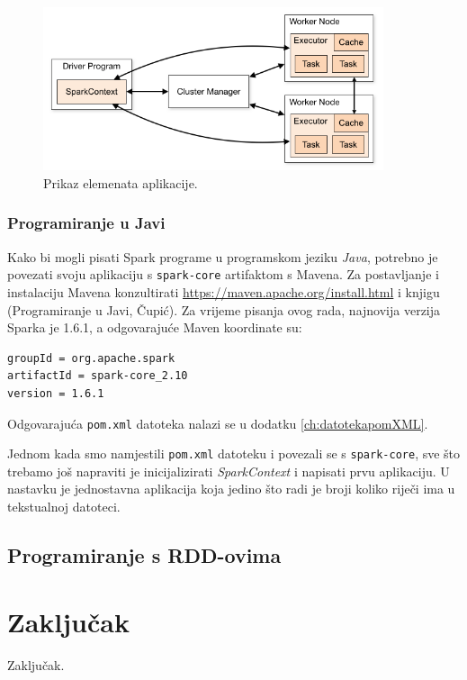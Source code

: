 \documentclass[times, utf8, zavrsni]{fer}
\begin{document}

\begin{figure}[htb]
\centering
\includegraphics[width=10cm]{img/cluster-overview.png}
\caption{Prikaz elemenata aplikacije.}
\label{fig:cluster-overview}
\end{figure}
\subsection{Programiranje u Javi}
Kako bi mogli pisati Spark programe u programskom jeziku \emph{Java}, potrebno je povezati svoju aplikaciju s \texttt{spark-core} artifaktom s Mavena. Za postavljanje i instalaciju Mavena konzultirati \url{https://maven.apache.org/install.html} i knjigu (Programiranje u Javi, Čupić). Za vrijeme pisanja ovog rada, najnovija verzija Sparka je 1.6.1, a odgovarajuće Maven koordinate su:
\begin{lstlisting}[language=bash]
groupId = org.apache.spark
artifactId = spark-core_2.10
version = 1.6.1
\end{lstlisting}
Odgovarajuća \texttt{pom.xml} datoteka nalazi se u dodatku \ref{ch:datotekapomXML}.

Jednom kada smo namjestili \texttt{pom.xml} datoteku i povezali se s \texttt{spark-core}, sve što trebamo još napraviti je inicijalizirati \emph{SparkContext} i napisati prvu aplikaciju. U nastavku je jednostavna aplikacija koja jedino što radi je broji koliko riječi ima u tekstualnoj datoteci.
\section{Programiranje s RDD-ovima}


\chapter{Zaključak}
Zaključak.



\end{document}
